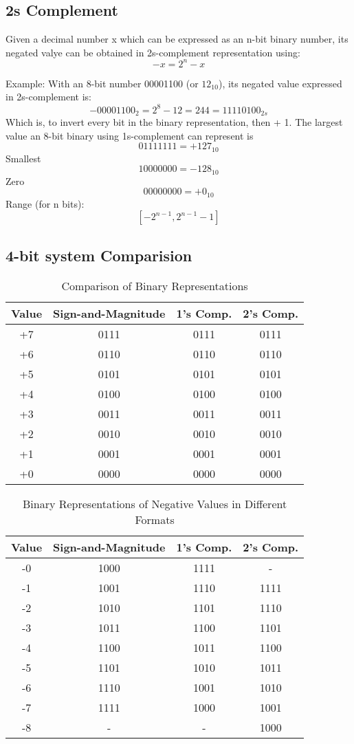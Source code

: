 \documentclass[12pt]{article} %
\begin{document}
\subsection{2s Complement}
Given a decimal number x which can be expressed as an n-bit binary number, its negated valye can be obtained in 2s-complement representation using:
\[-x = 2^n -x\]

Example: With an 8-bit number 00001100 (or \(12_{10}\)), its negated value expressed in 2s-complement is:
\[-00001100_2 = 2^8 - 12 = 244 = 11110100_{2s}\]
Which is, to invert every bit in the binary representation, then + 1.
The largest value an 8-bit binary using 1s-complement can represent is 
\[01111111 = +127_{10}\]
Smallest
\[10000000 = -128_{10}\]
Zero
\[00000000 = +0_{10}\]
Range (for n bits): 
\[[-2^{n - 1}, 2^{n - 1} - 1]\]
\newpage
\subsection*{4-bit system Comparision}
\begin{table}[h!]
    \centering
    \begin{tabular}{|c|c|c|c|}
    \hline
    \textbf{Value} & \textbf{Sign-and-Magnitude} & \textbf{1's Comp.} & \textbf{2's Comp.} \\
    \hline
    +7 & 0111 & 0111 & 0111 \\
    +6 & 0110 & 0110 & 0110 \\
    +5 & 0101 & 0101 & 0101 \\
    +4 & 0100 & 0100 & 0100 \\
    +3 & 0011 & 0011 & 0011 \\
    +2 & 0010 & 0010 & 0010 \\
    +1 & 0001 & 0001 & 0001 \\
    +0 & 0000 & 0000 & 0000 \\
    \hline
    \end{tabular}
    \caption{Comparison of Binary Representations}
    \end{table}
    
\begin{table}[h!]
    \centering
    \begin{tabular}{|c|c|c|c|}
    \hline
    \textbf{Value} & \textbf{Sign-and-Magnitude} & \textbf{1's Comp.} & \textbf{2's Comp.} \\
    \hline
    -0 & 1000 & 1111 & - \\
    -1 & 1001 & 1110 & 1111 \\
    -2 & 1010 & 1101 & 1110 \\
    -3 & 1011 & 1100 & 1101 \\
    -4 & 1100 & 1011 & 1100 \\
    -5 & 1101 & 1010 & 1011 \\
    -6 & 1110 & 1001 & 1010 \\
    -7 & 1111 & 1000 & 1001 \\
    -8 & -    & -    & 1000 \\
    \hline
    \end{tabular}
    \caption{Binary Representations of Negative Values in Different Formats}
\end{table}
\end{document}
